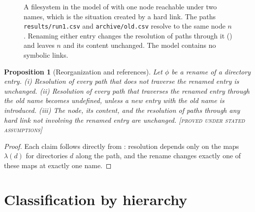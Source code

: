 \documentclass[11pt,twoside,openright]{book}
\theoremstyle{plain}
\newtheorem{proposition}[theorem]{Proposition}
\theoremstyle{definition}
\theoremstyle{remark}
\newcommand{\Proved}{\textup{\textsc{[proved under stated assumptions]}}}
\begin{document}
\begin{figure}[t]
\centering
{}
\caption{A filesystem in the model of  with one node reachable under two names, which is the situation created by a hard link. The paths \texttt{results/run1.csv} and \texttt{archive/old.csv} resolve to the same node $n$. Renaming either entry changes the resolution of paths through it () and leaves $n$ and its content unchanged. The model contains no symbolic links.}
\label{fig:fsidentity}
\end{figure}

\begin{proposition}[Reorganization and references]\label{prop:reorg}
Let $\phi$ be a rename of a directory entry. (i) Resolution of every path that does not traverse the renamed entry is unchanged. (ii) Resolution of every path that traverses the renamed entry through the old name becomes undefined, unless a new entry with the old name is introduced. (iii) The node, its content, and the resolution of paths through any hard link not involving the renamed entry are unchanged.
\Proved{}
\end{proposition}

\begin{proof}
Each claim follows directly from : resolution depends only on the maps $\lambda(d)$ for directories $d$ along the path, and the rename changes exactly one of these maps at exactly one name.
\end{proof}

\section{Classification by hierarchy}
\end{document}

